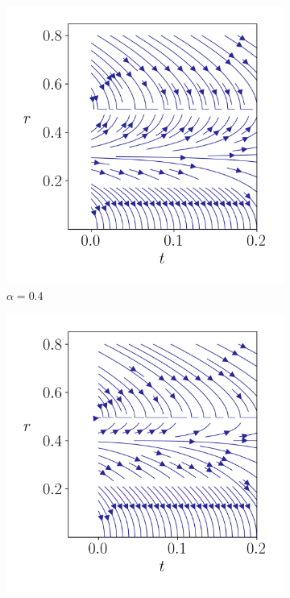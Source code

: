 \begin{figure}
    \begin{subfigure}{.5\linewidth}
        \centering
        \includegraphics[width=\linewidth]{figures/streamlines/mod2-a40.png}
        \caption{$\alpha=0.4$}
        \label{fig:inverse-sub1}
    \end{subfigure}%
    \begin{subfigure}{.5\linewidth}
        \centering
        \includegraphics[width=\linewidth]{figures/streamlines/mod2-a20.png}

\end{subfigure}
\end{figure}
